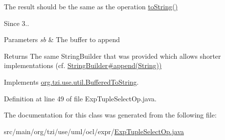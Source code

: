 The result should be the same as the operation \hyperlink{classorg_1_1tzi_1_1use_1_1uml_1_1ocl_1_1expr_1_1_expression_a01192513b1b1adbc44727a67ae14d02e}{to\-String()} 

\begin{DoxySince}{Since}
3.. 
\end{DoxySince}

\begin{DoxyParams}{Parameters}
{\em sb} & The buffer to append \\
\hline
\end{DoxyParams}
\begin{DoxyReturn}{Returns}
The same String\-Builder that was provided which allows shorter implementations (cf. \hyperlink{}{String\-Builder\#append(\-String))} 
\end{DoxyReturn}


Implements \hyperlink{interfaceorg_1_1tzi_1_1use_1_1util_1_1_buffered_to_string_aea95e4e53b18818d50ee253700e6e2d5}{org.\-tzi.\-use.\-util.\-Buffered\-To\-String}.



Definition at line 49 of file Exp\-Tuple\-Select\-Op.\-java.



The documentation for this class was generated from the following file\-:\begin{DoxyCompactItemize}
\item 
src/main/org/tzi/use/uml/ocl/expr/\hyperlink{_exp_tuple_select_op_8java}{Exp\-Tuple\-Select\-Op.\-java}\end{DoxyCompactItemize}
